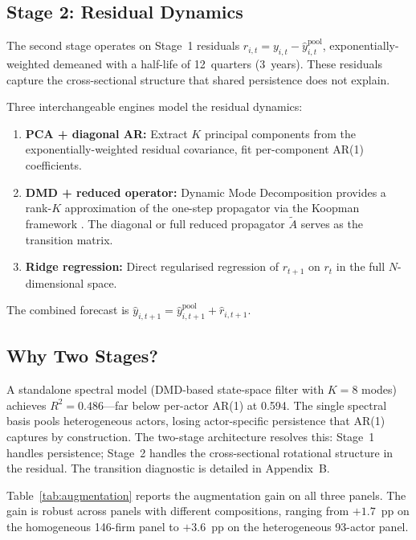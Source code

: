 \documentclass[11pt,a4paper]{article}
\begin{document}
\subsection{Stage 2: Residual Dynamics}

The second stage operates on Stage~1 residuals $r_{i,t} = y_{i,t} - \hat{y}^{\mathrm{pool}}_{i,t}$, exponentially-weighted demeaned with a half-life of 12~quarters (3~years). These residuals capture the cross-sectional structure that shared persistence does not explain.

Three interchangeable engines model the residual dynamics:
\begin{enumerate}[nosep]
  \item \textbf{PCA + diagonal AR:} Extract $K$ principal components from the exponentially-weighted residual covariance, fit per-component AR(1) coefficients.
  \item \textbf{DMD + reduced operator:} Dynamic Mode Decomposition provides a rank-$K$ approximation of the one-step propagator via the Koopman framework \citep[Appendix~A;][]{roshka2026spectral}. The diagonal or full reduced propagator $\tilde{A}$ serves as the transition matrix.
  \item \textbf{Ridge regression:} Direct regularised regression of $r_{t+1}$ on $r_t$ in the full $N$-dimensional space.
\end{enumerate}

The combined forecast is $\hat{y}_{i,t+1} = \hat{y}^{\mathrm{pool}}_{i,t+1} + \hat{r}_{i,t+1}$.

\subsection{Why Two Stages?}

A standalone spectral model (DMD-based state-space filter with $K = 8$ modes) achieves $R^2 = 0.486$---far below per-actor AR(1) at 0.594. The single spectral basis pools heterogeneous actors, losing actor-specific persistence that AR(1) captures by construction. The two-stage architecture resolves this: Stage~1 handles persistence; Stage~2 handles the cross-sectional rotational structure in the residual. The transition diagnostic is detailed in Appendix~B.

Table~\ref{tab:augmentation} reports the augmentation gain on all three panels. The gain is robust across panels with different compositions, ranging from $+1.7$~pp on the homogeneous 146-firm panel to $+3.6$~pp on the heterogeneous 93-actor panel.
\end{document}
